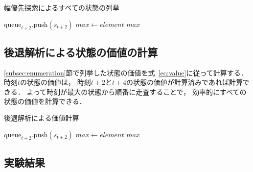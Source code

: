 \begin{algorithm}[tb]
\caption{幅優先探索によるすべての状態の列挙}
\label{alg:bfs}
\begin{algorithmic}[1]

            \State $\text{queue}_{t+2}.\text{push}(s_{t+2})$
        \EndFor
            \State $max \gets element$
        \EndIf
    \EndFor
    \State \Return $max$
\EndFunction

\end{algorithmic}
\end{algorithm}

\subsection{後退解析による状態の価値の計算}
\label{subsec:calculation}
\ref{subsec:enumeration}節で列挙した状態の価値を式~\ref{eq:value}に従って計算する．
時刻$t$の状態の価値は， 時刻$t+2$と$t+4$の状態の価値が計算済みであれば計算できる．
よって時刻が最大の状態から順番に走査することで， 効率的にすべての状態の価値を計算できる．

\begin{algorithm}[tb]
    \caption{後退解析による価値計算}
    \label{alg:calculation}
    \begin{algorithmic}[1]
    
                \State $\text{queue}_{t+2}.\text{push}(s_{t+2})$
            \EndFor
                \State $max \gets element$
            \EndIf
        \EndFor
        \State \Return $max$
    \EndFunction
    
    \end{algorithmic}
    \end{algorithm}

\subsection{実験結果}